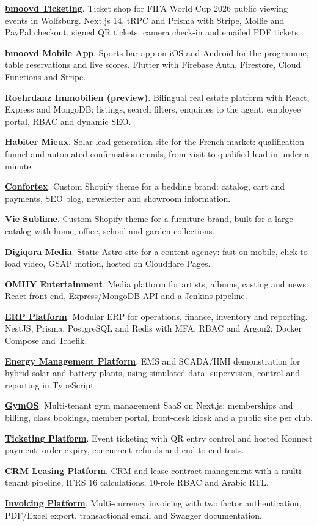 \documentclass[11pt,a4paper]{article}
\newcommand{\group}[1]{\Needspace{4\baselineskip}\vspace{4pt}{\bfseries\color{accent}#1}\par}
\newcommand{\project}[2]{\Needspace{3\baselineskip}\textbf{#1}. #2\par}
\begin{document}
\group{Freelance Client Work}
\project{\href{https://bmoovd-shop.com}{bmoovd Ticketing}}{Ticket shop for FIFA World Cup 2026 public viewing events in Wolfsburg. Next.js 14, tRPC and Prisma with Stripe, Mollie and PayPal checkout, signed QR tickets, camera check-in and emailed PDF tickets.}
\project{\href{https://apps.apple.com/de/app/bmoovd/id6736364332}{bmoovd Mobile App}}{Sports bar app on iOS and Android for the programme, table reservations and live scores. Flutter with Firebase Auth, Firestore, Cloud Functions and Stripe.}
\project{\href{https://rimmobilien-test.de/}{Roehrdanz Immobilien} (preview)}{Bilingual real estate platform with React, Express and MongoDB: listings, search filters, enquiries to the agent, employee portal, RBAC and dynamic SEO.}
\project{\href{https://habiter-mieux.info/}{Habiter Mieux}}{Solar lead generation site for the French market: qualification funnel and automated confirmation emails, from visit to qualified lead in under a minute.}
\project{\href{https://confortex.shop/}{Confortex}}{Custom Shopify theme for a bedding brand: catalog, cart and payments, SEO blog, newsletter and showroom information.}
\project{\href{https://www.viesublime.tn/}{Vie Sublime}}{Custom Shopify theme for a furniture brand, built for a large catalog with home, office, school and garden collections.}
\project{\href{https://digiqora-media.pages.dev}{Digiqora Media}}{Static Astro site for a content agency{}: fast on mobile, click-to-load video, GSAP motion, hosted on Cloudflare Pages.}
\project{OMHY Entertainment}{Media platform for artists, albums, casting and news. React front end, Express/MongoDB API and a Jenkins pipeline.}

\group{Products}
\project{\href{https://erp.products.axynoxia.com}{ERP Platform}}{Modular ERP for operations, finance, inventory and reporting. NestJS, Prisma, PostgreSQL and Redis with MFA, RBAC and Argon2; Docker Compose and Traefik.}
\project{\href{https://energie.products.axynoxia.com}{Energy Management Platform}}{EMS and SCADA/HMI demonstration for hybrid solar and battery plants, using simulated data: supervision, control and reporting in TypeScript.}
\project{\href{https://gymos.products.axynoxia.com}{GymOS}}{Multi-tenant gym management SaaS on Next.js: memberships and billing, class bookings, member portal, front-desk kiosk and a public site per club.}
\project{\href{https://tickets.products.axynoxia.com}{Ticketing Platform}}{Event ticketing with QR entry control and hosted Konnect payment; order expiry{}, concurrent refunds and end to end tests.}
\project{\href{https://crm-leasing.products.axynoxia.com}{CRM Leasing Platform}}{CRM and lease contract management with a multi-tenant pipeline, IFRS 16 calculations, 10-role RBAC and Arabic RTL.}
\project{\href{https://invoice.products.axynoxia.com}{Invoicing Platform}}{Multi-currency invoicing with two factor authentication, PDF/Excel export, transactional email and Swagger documentation.}
\end{document}

